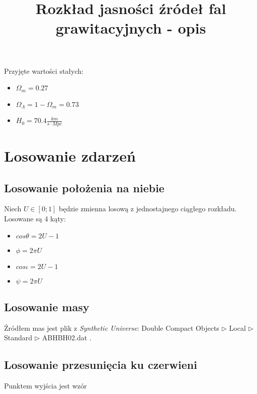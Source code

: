 \documentclass{article}
\begin{document}
\title{Rozkład jasności źródeł fal grawitacyjnych - opis}
\maketitle
\tableofcontents
Przyjęte wartości stałych:
\begin{itemize}
\item $\Omega_m = 0.27$
\item $\Omega_\Lambda = 1-\Omega_m =0.73$
\item $H_0=70.4 \frac{km}{s\cdot Mpc}$
\end{itemize}
\section{Losowanie zdarzeń}
\subsection{Losowanie położenia na niebie}
Niech $U\in[0;1]$ będzie zmienna losową z jednostajnego ciągłego rozkładu. Losowane są 4 kąty:
\begin{itemize}
\item$cos\theta=2U-1$
\item$\phi=2\pi U$
\item$cos\iota=2U-1$
\item$\psi=2\pi U$
\end{itemize}
\subsection{Losowanie masy}
Źródłem mas jest plik z \textit{Synthetic Universe}: Double Compact Objects $\triangleright$ Local $\triangleright$ Standard $\triangleright$ ABHBH02.dat .
\subsection{Losowanie przesunięcia ku czerwieni}
Punktem wyjścia jest wzór \cite[,Wzór 24]{hubble}
\end{document}
